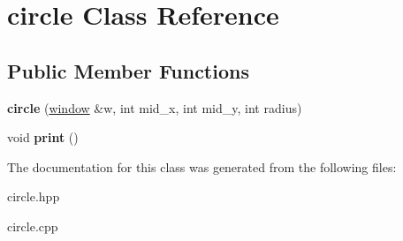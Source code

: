 \hypertarget{classcircle}{}\section{circle Class Reference}
\label{classcircle}
\subsection*{Public Member Functions}
\begin{DoxyCompactItemize}
\item 
\mbox{\label{classcircle_ac6ef4a49c741dcf33e5cf5d05768b450}} 
{\bfseries circle} (\hyperlink{classwindow}{window} \&w, int mid\+\_\+x, int mid\+\_\+y, int radius)
\item 
\mbox{\label{classcircle_a0c7d327e326648c249e1ba5439d1a7fa}} 
void {\bfseries print} ()
\end{DoxyCompactItemize}


The documentation for this class was generated from the following files\+:\begin{DoxyCompactItemize}
\item 
circle.\+hpp\item 
circle.\+cpp\end{DoxyCompactItemize}
